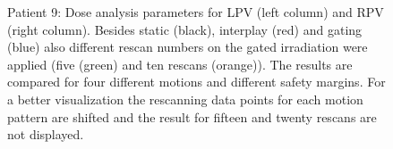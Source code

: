 \begin{figure}[H]
{ }
\caption{Patient 9: Dose analysis parameters for LPV (left column) and RPV (right column). Besides static (black), interplay (red) and gating 
(blue) also different rescan numbers on the gated irradiation were applied (five (green) and ten rescans (orange)). The results are compared for four different 
motions and different safety margins. For a better visualization the rescanning data points for each motion pattern are shifted and the result 
for fifteen and twenty rescans are not displayed.}
\label{static_interplay_gating_rescan_Pat09}
\end{figure}

\newpage

 \begin{figure}[H]
 \begin{center}
\end{center}
\end{figure}
